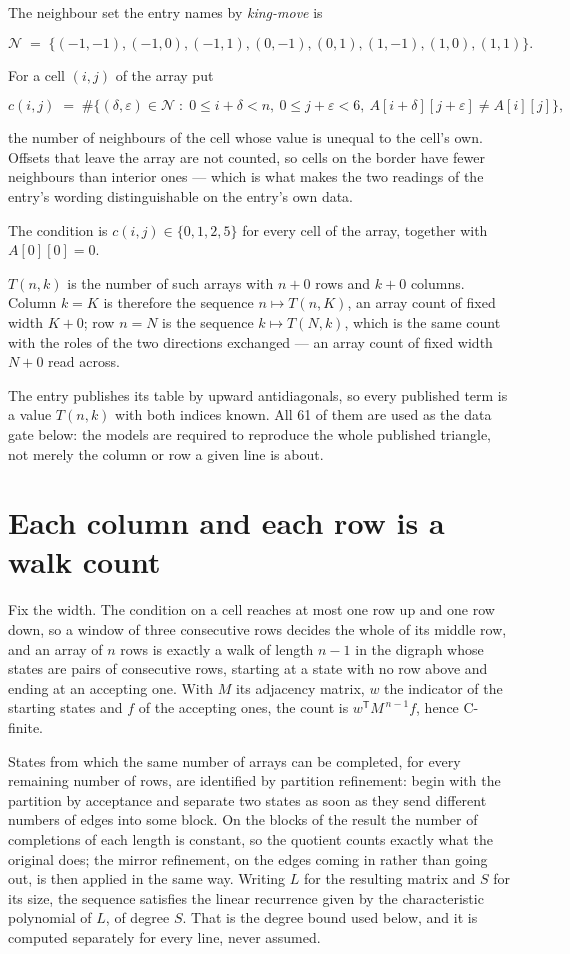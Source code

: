 \documentclass[11pt]{article}
\theoremstyle{definition}
\begin{document}
The neighbour set the entry names by {\itshape king-move} is

\[\mathcal{N} \;=\; \{(-1,-1), (-1,0), (-1,1), (0,-1), (0,1), (1,-1), (1,0), (1,1)\}.\]

For a cell $(i,j)$ of the array put

\[c(i,j) \;=\; \#\bigl\{(\delta,\varepsilon)\in\mathcal{N} \;:\; 0\le i+\delta<n,\ 0\le j+\varepsilon<6,\ A[i+\delta][j+\varepsilon] \neq A[i][j]\bigr\},\]

the number of neighbours of the cell whose value is unequal to the cell's own. Offsets that leave the array are not counted, so cells on the border have fewer neighbours than interior ones --- which is what makes the two readings of the entry's wording distinguishable on the entry's own data.

The condition is $c(i,j) \in \{0, 1, 2, 5\}$ for every cell of the array, together with $A[0][0]=0$.

$T(n,k)$ is the number of such arrays with $n + 0$ rows and $k + 0$ columns. Column $k = K$ is therefore the sequence $n \mapsto T(n,K)$, an array count of fixed width $K + 0$; row $n = N$ is the sequence $k \mapsto T(N,k)$, which is the same count with the roles of the two directions exchanged --- an array count of fixed width $N + 0$ read across.

The entry publishes its table by upward antidiagonals, so every published term is a value $T(n,k)$ with both indices known. All 61 of them are used as the data gate below: the models are required to reproduce the whole published triangle, not merely the column or row a given line is about.

\section{Each column and each row is a walk count}

Fix the width. The condition on a cell reaches at most one row up and one row down, so a window of three consecutive rows decides the whole of its middle row, and an array of $n$ rows is exactly a walk of length $n-1$ in the digraph whose states are pairs of consecutive rows, starting at a state with no row above and ending at an accepting one. With $M$ its adjacency matrix, $w$ the indicator of the starting states and $f$ of the accepting ones, the count is $w^{\mathsf T}M^{\,n-1}f$, hence C-finite.

States from which the same number of arrays can be completed, for every remaining number of rows, are identified by partition refinement: begin with the partition by acceptance and separate two states as soon as they send different numbers of edges into some block. On the blocks of the result the number of completions of each length is constant, so the quotient counts exactly what the original does; the mirror refinement, on the edges coming in rather than going out, is then applied in the same way. Writing $L$ for the resulting matrix and $S$ for its size, the sequence satisfies the linear recurrence given by the characteristic polynomial of $L$, of degree $S$. That is the degree bound used below, and it is computed separately for every line, never assumed.
\end{document}
